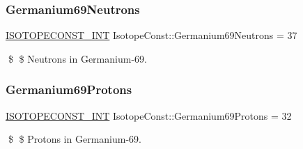 \subsubsection{\texorpdfstring{Germanium69\+Neutrons}{Germanium69Neutrons}}
{\footnotesize\ttfamily \mbox{\hyperlink{group___isotope_const-_macros_ga5f18360b3e99483a35c32d789e62621c}{I\+S\+O\+T\+O\+P\+E\+C\+O\+N\+S\+T\+\_\+\+I\+NT}} Isotope\+Const\+::\+Germanium69\+Neutrons = 37}

\$ \$ Neutrons in Germanium-\/69. \mbox{\label{group___isotope_const-_germanium-_ge69_gabbbdbbf5953514ebcd2d71e3b439b4e6}} 
\subsubsection{\texorpdfstring{Germanium69\+Protons}{Germanium69Protons}}
{\footnotesize\ttfamily \mbox{\hyperlink{group___isotope_const-_macros_ga5f18360b3e99483a35c32d789e62621c}{I\+S\+O\+T\+O\+P\+E\+C\+O\+N\+S\+T\+\_\+\+I\+NT}} Isotope\+Const\+::\+Germanium69\+Protons = 32}

\$ \$ Protons in Germanium-\/69. 